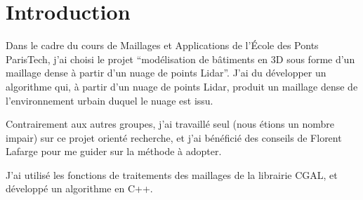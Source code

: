 \newpage
\thispagestyle{plain}




\section*{\centering Introduction}
Dans le cadre du cours de Maillages et Applications de l'École des Ponts ParisTech, j'ai choisi le projet ``modélisation de bâtiments en 3D sous forme d’un maillage dense à partir d’un nuage de points Lidar''. J'ai du développer un algorithme qui, à partir d'un nuage de points Lidar, produit un maillage dense de l'environnement urbain duquel le nuage est issu.

Contrairement aux autres groupes, j'ai travaillé seul (nous étions un nombre impair) sur ce projet orienté recherche, et j'ai bénéficié des conseils de Florent Lafarge pour me guider sur la méthode à adopter.

J'ai utilisé les fonctions de traitements des maillages de la librairie CGAL, et développé un algorithme en C++.
